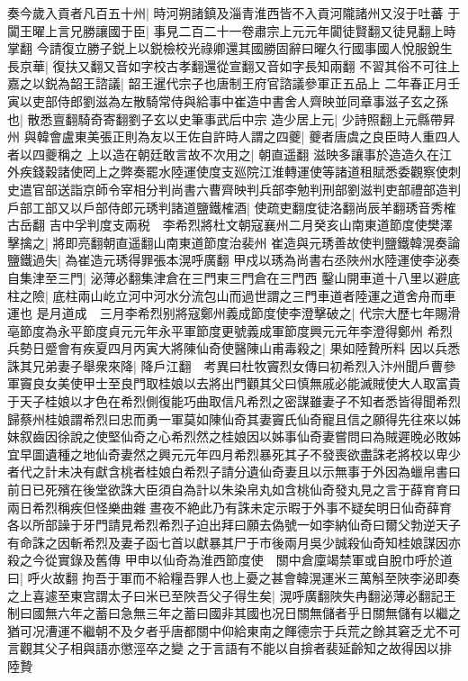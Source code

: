 奏今歲入貢者凡百五十州|{
	時河朔諸鎮及淄青淮西皆不入貢河隴諸州又沒于吐蕃}
于闐王曜上言兄勝讓國于臣|{
	事見二百二十一卷肅宗上元元年闐徒賢翻又徒見翻上時掌翻}
今請復立勝子鋭上以鋭檢校光祿卿還其國勝固辭曰曜久行國事國人悅服銳生長京華|{
	復扶又翻又音如字校古孝翻還從宣翻又音如字長知兩翻}
不習其俗不可往上嘉之以鋭為韶王諮議|{
	韶王暹代宗子也唐制王府官諮議參軍正五品上}
二年春正月壬寅以吏部侍郎劉滋為左散騎常侍與給事中崔造中書舍人齊映並同章事滋子玄之孫也|{
	散悉亶翻騎奇寄翻劉子玄以史筆事武后中宗}
造少居上元|{
	少詩照翻上元縣帶昇州}
與韓會盧東美張正則為友以王佐自許時人謂之四夔|{
	夔者唐虞之良臣時人重四人者以四夔稱之}
上以造在朝廷敢言故不次用之|{
	朝直遥翻}
滋映多讓事於造造久在江外疾錢穀諸使罔上之弊奏罷水陸運使度支廵院江淮轉運使等諸道租賦悉委觀察使刺史遣官部送詣京師令宰相分判尚書六曹齊映判兵部李勉判刑部劉滋判吏部禮部造判戶部工部又以戶部侍郎元琇判諸道鹽鐵榷酒|{
	使疏吏翻度徒洛翻尚辰羊翻琇音秀榷古岳翻}
吉中孚判度支兩税　李希烈將杜文朝寇襄州二月癸亥山南東道節度使樊澤擊擒之|{
	將即亮翻朝直遥翻山南東道節度治裴州}
崔造與元琇善故使判鹽鐵韓滉奏論鹽鐵過失|{
	為崔造元琇得罪張本滉呼廣翻}
甲戍以琇為尚書右丞陜州水陸運使李泌奏自集津至三門|{
	泌薄必翻集津倉在三門東三門倉在三門西}
鑿山開車道十八里以避底柱之險|{
	底柱兩山屹立河中河水分流包山而過世謂之三門車道者陸運之道舍舟而車運也}
是月道成　三月李希烈别將寇鄭州義成節度使李澄擊破之|{
	代宗大歷七年賜滑亳節度為永平節度貞元元年永平軍節度更號義成軍節度興元元年李澄得鄭州}
希烈兵勢日蹙會有疾夏四月丙寅大將陳仙奇使醫陳山甫毒殺之|{
	果如陸贄所料}
因以兵悉誅其兄弟妻子舉衆來降|{
	降戶江翻　考異曰杜牧竇烈女傳曰初希烈入汴州聞戶曹參軍竇良女美使甲士至良門取桂娘以去將出門顴其父曰慎無戚必能滅賊使大人取富貴于天子桂娘以才色在希烈側復能巧曲取信凡希烈之密謀雖妻子不知者悉皆得聞希烈歸蔡州桂娘謂希烈曰忠而勇一軍莫如陳仙奇其妻竇氏仙奇寵且信之願得先往來以姊妹叙齒因徐說之使堅仙奇之心希烈然之桂娘因以姊事仙奇妻嘗問曰為賊遲晚必敗姊宜早圖遺種之地仙奇妻然之興元元年四月希烈暴死其子不發喪欲盡誅老將校以卑少者代之計未决有獻含桃者桂娘白希烈子請分遺仙奇妻且以示無事于外因為蠟帛書曰前日已死殯在後堂欲誅大臣須自為計以朱染帛丸如含桃仙奇發丸見之言于薛育育曰兩日希烈稱疾但怪樂曲雜晝夜不絶此乃有誅未定示暇于外事不疑矣明日仙奇薛育各以所部譟于牙門請見希烈希烈子迫出拜曰願去偽號一如李納仙奇曰爾父勃逆天子有命誅之因斬希烈及妻子函七首以獻暴其尸于市後兩月吳少誠殺仙奇知桂娘謀因亦殺之今從實錄及舊傳}
甲申以仙奇為淮西節度使　關中倉廩竭禁軍或自脫巾呼於道曰|{
	呼火故翻}
拘吾于軍而不給糧吾罪人也上憂之甚會韓滉運米三萬斛至陜李泌即奏之上喜遽至東宫謂太子曰米已至陜吾父子得生矣|{
	滉呼廣翻陜失冉翻泌薄必翻記王制曰國無六年之蓄曰急無三年之蓄曰國非其國也况日關無儲者乎日關無儲有以繼之猶可况漕運不繼朝不及夕者乎唐都關中仰給東南之餫德宗于兵荒之餘其窘乏尤不可言觀其父子相與語亦懲涇卒之變之于言語有不能以自揜者裴延齡知之故得因以排陸贄}
